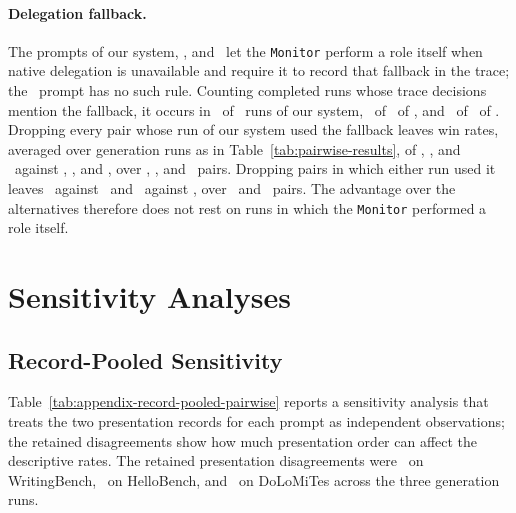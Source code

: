 \paragraph{Delegation fallback.}
The prompts of our system, \condNoGoals, and \condFixedOrder\ let the \texttt{Monitor} perform a role itself when native delegation is unavailable and require it to record that fallback in the trace; the \condTaskPlanning\ prompt has no such rule.
Counting completed runs whose trace decisions mention the fallback, it occurs in \AfourFallbackRuns\ of \AfourRunCount\ runs of our system, \AfiveFallbackRuns\ of \AfiveFallbackCompleted\ of \condNoGoals, and \AsixFallbackRuns\ of \AsixFallbackCompleted\ of \condFixedOrder.
Dropping every pair whose run of our system used the fallback leaves win rates, averaged over generation runs as in Table~\ref{tab:pairwise-results}, of \NoFallbackFullSinglePassRate, \NoFallbackFullStagedRate, and \NoFallbackFullTaskPlanningRate\ against \condSinglePass, \condStaged, and \condTaskPlanning, over \NoFallbackFullSinglePassPairs, \NoFallbackFullStagedPairs, and \NoFallbackFullTaskPlanningPairs\ pairs.
Dropping pairs in which either run used it leaves \NoFallbackFullNoGoalsRate\ against \condNoGoals\ and \NoFallbackFullFixedOrderRate\ against \condFixedOrder, over \NoFallbackFullNoGoalsPairs\ and \NoFallbackFullFixedOrderPairs\ pairs.
The advantage over the alternatives therefore does not rest on runs in which the \texttt{Monitor} performed a role itself.

\section{Sensitivity Analyses}
\label{app:sensitivity-analyses}
\subsection{Record-Pooled Sensitivity}
\label{app:record-pooled}
Table~\ref{tab:appendix-record-pooled-pairwise} reports a sensitivity analysis that treats the two presentation records for each prompt as independent observations; the retained disagreements show how much presentation order can affect the descriptive rates.
The retained presentation disagreements were \WritingPresentationDisagreementRate\ on WritingBench, \HelloPresentationDisagreementRate\ on HelloBench, and \DoLoPresentationDisagreementRate\ on DoLoMiTes across the three generation runs.


